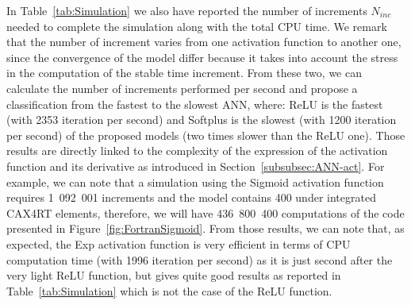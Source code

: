 \documentclass[algorithms,article,submit,pdftex,oneauthors]{Definitions/mdpi}
\begin{document}
In Table~\ref{tab:Simulation} we also have reported the number of increments $N_{inc}$ needed to complete the simulation along with the total CPU time.
We remark that the number of increment varies from one activation function to another one, since the convergence of the model differ because it takes into account the stress in the computation of the stable time increment.
From these two, we can calculate the number of increments performed per second and propose a classification from the fastest to the slowest ANN, where: ReLU is the fastest (with 2353 iteration per second) and Softplus is the slowest (with 1200 iteration per second) of the proposed models (two times slower than the ReLU one).
Those results are directly linked to the complexity of the expression of the activation function and its derivative as introduced in Section~\ref{subsubsec:ANN-act}.
For example, we can note that a simulation using the Sigmoid activation function requires 1~092~001 increments and the model contains 400 under integrated CAX4RT elements, therefore, we will have 436~800~400 computations of the code presented in Figure~\ref{fig:FortranSigmoid}.
From those results, we can note that, as expected, the Exp activation function is very efficient in terms of CPU computation time (with 1996 iteration per second) as it is just second after the very light ReLU function, but gives quite good results as reported in Table~\ref{tab:Simulation} which is not the case of the ReLU function.
\end{document}
